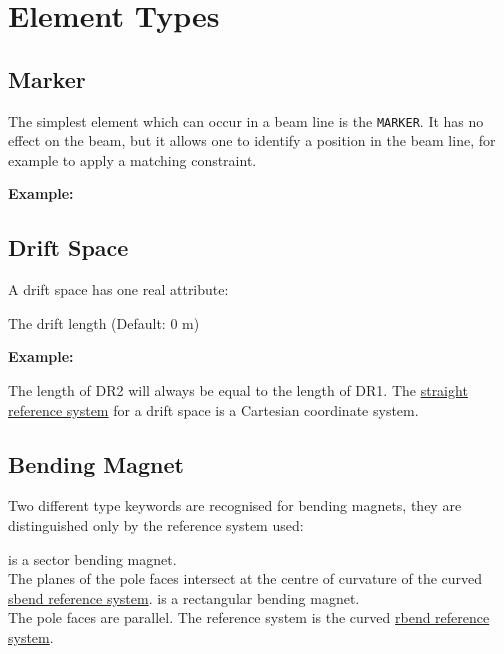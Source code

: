 
\chapter{Element Types}
\label{chap:elements}

\section{Marker}
\label{sec:marker}

The simplest element which can occur in a beam line is the \texttt{MARKER}. It
has no effect on the beam, but it allows one to identify a position in
the beam line, for example to apply a matching constraint.  

\textbf{Example:}


\section{Drift Space}
\label{sec:drift}


A drift space has one real attribute: 
\begin{madlist}
    The drift length (Default: 0 m) 
\end{madlist}

\textbf{Example:}

The length of DR2 will always be equal to the length of DR1. The
\hyperref[subsec:local-straight]{straight reference system} for a drift
space is a Cartesian coordinate system.   


\section{Bending Magnet}
\label{sec:bend}
Two different type keywords are recognised for bending magnets, they are
distinguished only by the reference system used:  
\begin{madlist}
  \label{bend-sbend} is a sector bending magnet. \\
  The planes of the pole faces intersect at the centre of curvature of
  the curved \hyperref[subsec:local-rbend]{sbend reference system}.  
  \label{bend-rbend} is a rectangular bending magnet. \\ 
  The pole faces are parallel. The reference system is the curved  
  \hyperref[subsec:local-rbend]{rbend reference system}.
\end{madlist}

